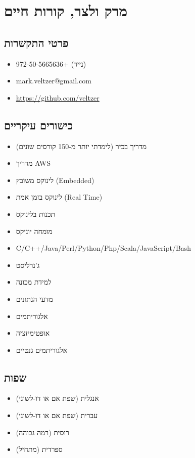 \documentclass[
  hebrew,
]{article}
\author{}
\date{}
\providecommand{\tightlist}{%
  \setlength{\itemsep}{0pt}\setlength{\parskip}{0pt}}
\begin{document}
\section{מרק ולצר, קורות
חיים}\label{ux5deux5e8ux5e7-ux5d5ux5dcux5e6ux5e8-ux5e7ux5d5ux5e8ux5d5ux5ea-ux5d7ux5d9ux5d9ux5dd}

\subsection{פרטי
התקשרות}\label{ux5e4ux5e8ux5d8ux5d9-ux5d4ux5eaux5e7ux5e9ux5e8ux5d5ux5ea}

\begin{itemize}
\tightlist
\item
  972-50-5665636+ (נייד)
\item
  mark.veltzer@gmail.com
\item
  \url{https://github.com/veltzer}
\end{itemize}

\subsection{כישורים
עיקריים}\label{ux5dbux5d9ux5e9ux5d5ux5e8ux5d9ux5dd-ux5e2ux5d9ux5e7ux5e8ux5d9ux5d9ux5dd}

\begin{itemize}
\tightlist
\item
  מדריך בכיר (לימדתי יותר מ-150 קורסים שונים)
\item
  מדריך AWS
\item
  לינוקס משובץ (Embedded)
\item
  לינוקס בזמן אמת (Real Time)
\item
  תכנות בלינוקס
\item
  מומחה יוניקס
\item
  C/C++/Java/Perl/Python/Php/Scala/JavaScript/Bash
\item
  ג'נרליסט
\item
  למידת מכונה
\item
  מדעי הנתונים
\item
  אלגוריתמים
\item
  אופטימיזציה
\item
  אלגוריתמים גנטיים
\end{itemize}

\subsection{שפות}\label{ux5e9ux5e4ux5d5ux5ea}

\begin{itemize}
\tightlist
\item
  אנגלית (שפת אם או דו-לשוני)
\item
  עברית (שפת אם או דו-לשוני)
\item
  רוסית (רמה גבוהה)
\item
  ספרדית (מתחיל)
\end{itemize}
\end{document}
